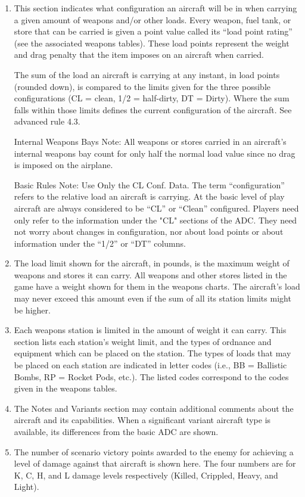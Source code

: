 \begin{enumerate}[resume]
    \item {} 
    This section indicates what configuration an aircraft will be in when carrying a given amount of weapons and/or other loads. Every weapon, fuel tank, or store that can be carried is given a point value called its “load point rating” (see the associated weapons tables). These load points represent the weight and drag penalty that the item imposes on an aircraft when carried.

    The sum of the load an aircraft is carrying at any instant, in load points (rounded down), is compared to the limits given for the three possible configurations (CL = clean, 1/2 = half-dirty, DT = Dirty). Where the sum falls within those limits defines the current configuration of the aircraft. See advanced rule 4.3.

    Internal Weapons Bays Note: All weapons or stores carried in an aircraft's internal weapons bay count for only half the normal load value since no drag is imposed on the airplane.

    Basic Rules Note:  Use Only the CL Conf. Data. The term “configuration” refers to the relative load an aircraft is carrying. At the basic level of play aircraft are always considered to be “CL” or “Clean” configured. Players need only refer to the information under the "CL" sections of the ADC. They need not worry about changes in configuration, nor about load points or about information under the “1/2” or “DT” columns.
    
    \item {}
    The load limit shown for the aircraft, in pounds, is the maximum weight of weapons and stores it can carry. All weapons and other stores listed in the game have a weight shown for them in the weapons charts. The aircraft's load may never exceed this amount even if the sum of all its station limits might be higher.

    \item {} 
    Each weapons station is limited in the amount of weight it can carry. This section lists each station's weight limit, and the types of ordnance and equipment which can be placed on the station. The types of loads that may be placed on each station are indicated in letter codes (i.e., BB = Ballistic Bombs, RP = Rocket Pods, etc.). The listed codes correspond to the codes given in the weapons tables.

    \item {} 
    The Notes and Variants section may contain additional comments about the aircraft and its capabilities. When a significant variant aircraft type is available, its differences from the basic ADC are shown.

    \item {} 
    The number of scenario victory points awarded to the enemy for achieving a level of damage against that aircraft is shown here. The four numbers are for K, C, H, and L damage levels respectively (Killed, Crippled, Heavy, and Light).

\end{enumerate}

